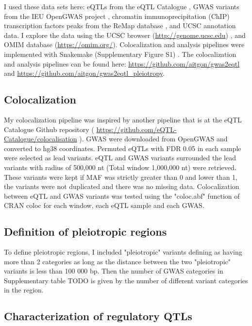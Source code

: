 I used these data sets here: eQTLs from the eQTL Catalogue \citep{2021.Alasoo.Kerimov}, GWAS variants from the IEU OpenGWAS project \citep{2021.Marcora.Lyon}, chromatin immunoprecipitation (ChIP) transcription factors peaks from the ReMap database \citep{2021.Ballester.Hammal}, and UCSC annotation data.
%
I explore the data using the UCSC browser (\url{http://genome.ucsc.edu}) \citep{2021.Kent.Lee}, and OMIM database (\url{https://omim.org/}).
%
Colocalization and analysis pipelines were implemented with Snakemake (Supplementary Figure S1) .
%
The colocalization and analysis pipelines can be found here: \url{https://github.com/aitgon/gwas2eqtl} and \url{https://github.com/aitgon/gwas2eqtl_pleiotropy}.

\subsection*{Colocalization}

My colocalization pipeline was inspired by another pipeline that is at the eQTL Catalogue Github repository ( \url{https://github.com/eQTL-Catalogue/colocalisation} ).
%
GWAS were downloaded from OpenGWAS and converted to hg38 coordinates.
%
Permuted eQTLs with FDR 0.05 in each sample were selected as lead variants.
%
eQTL and GWAS variants surrounded the lead variants with radius of 500,000 nt (Total window 1,000,000 nt) were retrieved.
%
These variants were kept if MAF was strictly greater than 0 and lower than 1, the variants were not duplicated and there was no missing data.
%
Colocalization between eQTL and GWAS variants was tested using the "coloc.abf" function of CRAN coloc for each window, each eQTL sample and each GWAS.

\subsection*{Definition of pleiotropic regions}

To define pleiotropic regions, I included "pleiotropic" variants defining as having more than 2 categories as long as the distance between the two "pleiotropic" variants is less than 100 000 bp.
%
Then the number of GWAS categories in Supplementary table TODO is given by the number of different variant categories in the region.

\subsection*{Characterization of regulatory QTLs}

